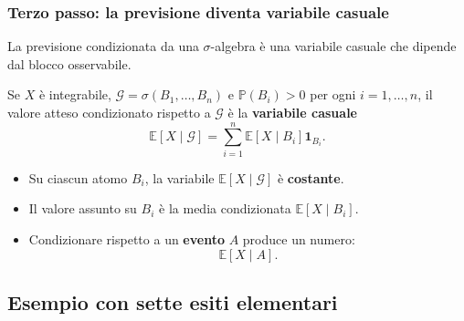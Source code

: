 \documentclass[handout]{beamer}%
\newenvironment{stepitemize}{\begin{itemize}[<+->]}{\end{itemize} }
\providecommand{\E}{\mathbb{E}}
\providecommand{\Prob}{\mathbb{P}}
\providecommand{\G}{\mathcal{G}}
\providecommand{\1}{\mathbf{1}}
\providecommand{\QTR}[2]{\csname #1\endcsname{#2}}
\begin{document}
\begin{frame}%
%

\frametitle{Terzo passo: la previsione diventa variabile casuale}%
%

%


\textcolor{light-blue}{La previsione condizionata da una $\sigma$-algebra \`{e} una variabile
casuale che dipende dal blocco osservabile.}

\medskip

Se $X$ \`{e} integrabile, $\G=\sigma(B_{1},\ldots,B_{n})$ e $\Prob(B_{i})>0$
per ogni $i=1,\ldots,n$, il valore atteso condizionato rispetto a $\G$ \`{e}
la \textbf{variabile casuale}
\[
\E[X\mid\G] = \sum_{i=1}^{n}\E[X\mid B_i]\1_{B_{i}}.
\]


\medskip

\begin{stepitemize}
\item Su ciascun atomo $B_{i}$, la variabile $\E[X\mid\G]$ \`{e}
\textbf{costante}.

\item Il valore assunto su $B_{i}$ \`{e} la media condizionata $\E[X\mid B_i]$.

\item Condizionare rispetto a un \textbf{evento} $A$ produce un numero:
\[
\E[X\mid A].
\]

\end{stepitemize}%

\transboxout
\end{frame}%




\subsection{Esempio con sette esiti elementari}%
\end{document}

